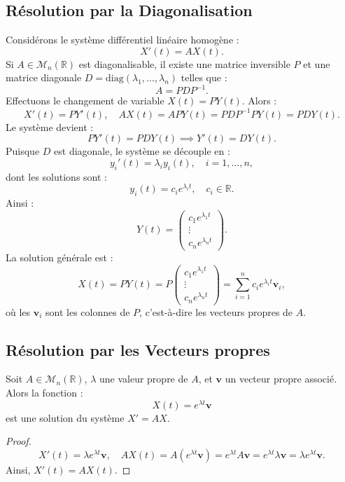 
\subsection{Résolution par la Diagonalisation}
Considérons le système différentiel linéaire homogène :
\[
X'(t) = AX(t).
\]
Si \( A \in \mathcal{M}_n(\mathbb{R}) \) est diagonalisable, il existe une matrice inversible \( P \) et une matrice diagonale \( D = \text{diag}(\lambda_1, \dots, \lambda_n) \) telles que :
\[
A = P D P^{-1}.
\]
Effectuons le changement de variable \( X(t) = P Y(t) \). Alors :
\[
X'(t) = P Y'(t), \quad A X(t) = A P Y(t) = P D P^{-1} P Y(t) = P D Y(t).
\]
Le système devient :
\[
P Y'(t) = P D Y(t) \implies Y'(t) = D Y(t).
\]
Puisque \( D \) est diagonale, le système se découple en :
\[
y_i'(t) = \lambda_i y_i(t), \quad i = 1, \dots, n,
\]
dont les solutions sont :
\[
y_i(t) = c_i e^{\lambda_i t}, \quad c_i \in \mathbb{R}.
\]
Ainsi :
\[
Y(t) = \begin{pmatrix} c_1 e^{\lambda_1 t} \\ \vdots \\ c_n e^{\lambda_n t} \end{pmatrix}.
\]
La solution générale est :
\[
X(t) = P Y(t) = P \begin{pmatrix} c_1 e^{\lambda_1 t} \\ \vdots \\ c_n e^{\lambda_n t} \end{pmatrix} = \sum_{i=1}^n c_i e^{\lambda_i t} \mathbf{v}_i,
\]
où les \( \mathbf{v}_i \) sont les colonnes de \( P \), c'est-à-dire les vecteurs propres de \( A \).

\subsection{Résolution par les Vecteurs propres}
\begin{proposition}
	Soit \( A \in \mathcal{M}_n(\mathbb{R}) \), \( \lambda \) une valeur propre de \( A \), et \( \mathbf{v} \) un vecteur propre associé. Alors la fonction :
	\[
	X(t) = e^{\lambda t} \mathbf{v}
	\]
	est une solution du système \( X' = AX \).
\end{proposition}
\begin{proof}
	\[
	X'(t) = \lambda e^{\lambda t} \mathbf{v}, \quad A X(t) = A (e^{\lambda t} \mathbf{v}) = e^{\lambda t} A \mathbf{v} = e^{\lambda t} \lambda \mathbf{v} = \lambda e^{\lambda t} \mathbf{v}.
	\]
	Ainsi, \( X'(t) = A X(t) \).
\end{proof}

